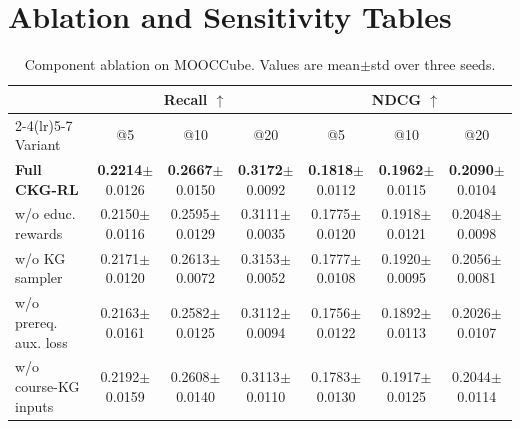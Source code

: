 \documentclass[letterpaper]{article}
\newcommand{\sd}[1]{{\footnotesize$\pm$#1}}
\newcommand{\tablecaptiongap}{\vspace{0.35em}}
\begin{document}
\clearpage



\clearpage

\section{Ablation and Sensitivity Tables}

\begin{table}[t]
\centering
\caption{Component ablation on MOOCCube. Values are mean\(\pm\)std over three seeds.}
\label{tab:supp-core-ablation}
\tablecaptiongap
\footnotesize
\begin{tabular*}{\textwidth}{@{\extracolsep{\fill}}lcccccc}
\toprule
& \multicolumn{3}{c}{Recall \(\uparrow\)} & \multicolumn{3}{c}{NDCG \(\uparrow\)} \\
\cmidrule(lr){2-4}\cmidrule(lr){5-7}
Variant & \multicolumn{1}{c}{@5} & \multicolumn{1}{c}{@10} & \multicolumn{1}{c}{@20} & \multicolumn{1}{c}{@5} & \multicolumn{1}{c}{@10} & \multicolumn{1}{c}{@20} \\
\midrule
\textbf{Full CKG-RL} & \textbf{0.2214}\sd{0.0126} & \textbf{0.2667}\sd{0.0150} & \textbf{0.3172}\sd{0.0092} & \textbf{0.1818}\sd{0.0112} & \textbf{0.1962}\sd{0.0115} & \textbf{0.2090}\sd{0.0104} \\
w/o educ. rewards & 0.2150\sd{0.0116} & 0.2595\sd{0.0129} & 0.3111\sd{0.0035} & 0.1775\sd{0.0120} & 0.1918\sd{0.0121} & 0.2048\sd{0.0098} \\
w/o KG sampler & 0.2171\sd{0.0120} & 0.2613\sd{0.0072} & 0.3153\sd{0.0052} & 0.1777\sd{0.0108} & 0.1920\sd{0.0095} & 0.2056\sd{0.0081} \\
w/o prereq. aux. loss & 0.2163\sd{0.0161} & 0.2582\sd{0.0125} & 0.3112\sd{0.0094} & 0.1756\sd{0.0122} & 0.1892\sd{0.0113} & 0.2026\sd{0.0107} \\
w/o course-KG inputs & 0.2192\sd{0.0159} & 0.2608\sd{0.0140} & 0.3113\sd{0.0110} & 0.1783\sd{0.0130} & 0.1917\sd{0.0125} & 0.2044\sd{0.0114} \\
\bottomrule
\end{tabular*}
\end{table}
\end{document}
